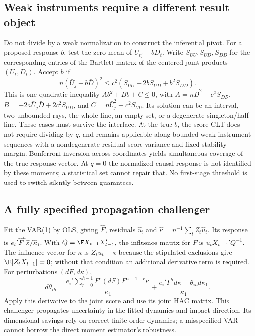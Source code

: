 \subsection{Weak instruments require a different result object}
Do not divide by a weak normalization to construct the inferential pivot.
For a proposed response $b$, test the zero mean of $U_{tj}-bD_t$.
Write $S_{UU},S_{UD},S_{DD}$ for the corresponding entries of the
Bartlett matrix of the centered joint products $(U_t,D_t)$. Accept $b$ if
\begin{equation}
 n(\bar U_j-b\bar D)^2
 \le c^2(S_{UU}-2bS_{UD}+b^2S_{DD}).
 \label{s4:weak-inversion}
\end{equation}
This is one quadratic inequality $A b^2+B b+C\le0$, with
$A=n\bar D^2-c^2S_{DD}$,
$B=-2n\bar U_j\bar D+2c^2S_{UD}$, and
$C=n\bar U_j^2-c^2S_{UU}$.
Its solution can be an interval, two unbounded rays, the whole line,
an empty set, or a degenerate singleton/half-line. These cases must survive
the interface. At the true $b$, the score CLT does not require dividing
by $q$, and remains applicable along bounded weak-instrument sequences
with a nondegenerate residual-score variance and fixed stability margin.
Bonferroni inversion across coordinates yields simultaneous coverage of
the true response vector. At $q=0$ the normalized causal response is
not identified by these moments; a statistical set cannot repair that.
No first-stage threshold is used to switch silently between guarantees.

\subsection{A fully specified propagation challenger}
Fit the VAR(1) by OLS, giving $\widehat F$, residuals $\widehat u_t$ and
$\widehat\kappa=n^{-1}\sum_tZ_t\widehat u_t$. Its response is
$e_i'\widehat F^h\widehat\kappa/\widehat\kappa_1$.
With $Q=\E X_{t-1}X_{t-1}'$, the influence matrix for $F$ is
$u_tX_{t-1}'Q^{-1}$. The influence vector for $\kappa$ is
$Z_tu_t-\kappa$ because the stipulated exclusions give
$\E[Z_tX_{t-1}]=0$; without that condition an additional derivative term
is required. For perturbations $(dF,d\kappa)$,
\[
 d\theta_{ih}=\frac{e_i'\sum_{r=0}^{h-1}F^r(dF)F^{h-1-r}\kappa}
                       {\kappa_1}
 +\frac{e_i'F^hd\kappa-\theta_{ih}d\kappa_1}{\kappa_1}.
\]
Apply this derivative to the joint score and use its joint HAC matrix.
This challenger propagates uncertainty in the fitted dynamics and impact
direction. Its dimensional savings rely on correct finite-order dynamics;
a misspecified VAR cannot borrow the direct moment estimator's robustness.

